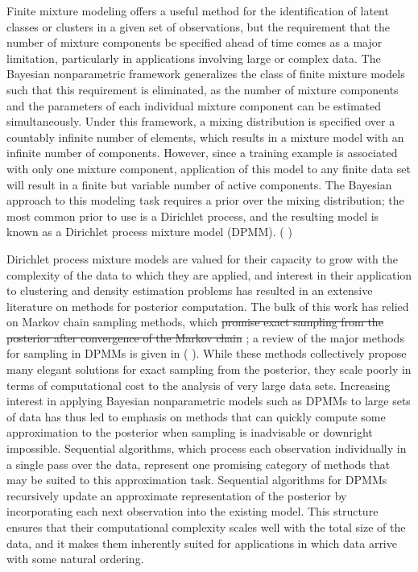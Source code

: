 \documentclass{uwstat572}
\newcommand{\vmdel}[1]{\sout{#1}}
\newcommand{\vmadd}[1]{\textbf{\color{red}{#1}}}
\newcommand{\vmcomment}[1]{({\color{blue}{VM's comment:}} \textbf{\color{blue}{#1}})}
\begin{document}
Finite mixture modeling offers a useful method for the identification of latent classes or clusters in a given set of observations, but the requirement that the number of mixture components be specified ahead of time comes as a major limitation, particularly in applications involving large or complex data. The Bayesian nonparametric framework generalizes the class of finite mixture models such that this requirement is eliminated, as the number of mixture components and the parameters of each individual mixture component can be estimated simultaneously. Under this framework, a mixing distribution is specified over a countably infinite number of elements, which results in a mixture model with an infinite number of components. However, since a training example is associated with only one mixture component, application of this model to any finite data set will result in a finite but variable number of active components. The Bayesian approach to this modeling task requires a prior over the mixing distribution; the most common prior to use is a Dirichlet process, and the resulting model is known as a Dirichlet process mixture model (DPMM). \vmcomment{I would back up a lot of statements above with references to ``classic" DPMM references, starting with Ferguson.}

Dirichlet process mixture models are valued for their capacity to grow \vmadd{in the number of density components} with the complexity of the data to which they are applied, and interest in their application to clustering and density estimation problems has resulted in an extensive literature on methods for posterior computation. The bulk of this work has relied on Markov chain sampling methods, which \vmdel{promise exact sampling from the posterior after convergence of the Markov chain} \vmadd{approximate the exact posterior via the ergodic theorem}; a review of the major methods for sampling in DPMMs is given in \citet{neal} \vmcomment{Somewhat dated references, there is recent work on parallel MCMC for DPMMs, for example. I am sure there is more recent MCMC developments}. While these methods collectively propose many elegant solutions for exact sampling from the posterior, they scale poorly in terms of computational cost to the analysis of very large data sets. Increasing interest in applying Bayesian nonparametric models\vmadd{,} such as DPMMs\vmadd{,} to large sets of data has thus led to emphasis on methods that can quickly compute some approximation to the posterior when sampling is inadvisable or downright impossible. Sequential algorithms, which process each observation individually in a single pass over the data, represent one promising category of methods that may be suited to this approximation task. Sequential algorithms for DPMMs recursively update an approximate representation of the posterior by incorporating each next observation into the existing model. This structure ensures that their computational complexity scales well with the total size of the data, and it makes them inherently suited for applications in which data arrive with some natural ordering.
\end{document}
